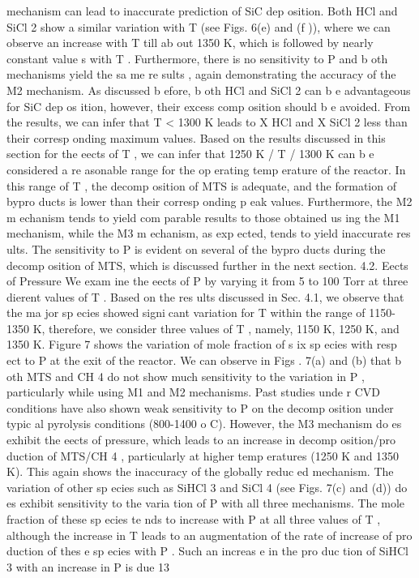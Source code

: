 \documentclass[10pt, letterpaper]{article}
\begin{document}
mechanism can lead to inaccurate prediction of SiC dep osition.
Both HCl and SiCl
2
show a similar variation with
T
(see Figs. 6(e) and (f )), where we can observe an
increase with
T
till ab out 1350 K, which is followed by nearly constant value s with
T
. Furthermore, there
is no sensitivity to
P
and b oth mechanisms yield the sa me re sults , again demonstrating the accuracy of the
M2 mechanism. As discussed b efore, b oth HCl and SiCl
2
can b e advantageous for SiC dep os ition, however,
their excess comp osition should b e avoided. From the results, we can infer that
T <
1300 K leads to
X
HCl
and
X
SiCl
2
less than their corresp onding maximum values.
Based on the results discussed in this section for the eects of
T
, we can infer that 1250 K
/
T
/
1300 K
can b e considered a re asonable range for the op erating temp erature of the reactor. In this range of
T
, the
decomp osition of MTS is adequate, and the formation of bypro ducts is lower than their corresp onding p eak
values. Furthermore, the M2 m echanism tends to yield com parable results to those obtained us ing the M1
mechanism, while the M3 m echanism, as exp ected, tends to yield inaccurate res ults. The sensitivity to
P
is evident on several of the bypro ducts during the decomp osition of MTS, which is discussed further in the
next section.
4.2. Eects of Pressure
We exam ine the eects of
P
by varying it from 5 to 100 Torr at three dierent values of
T
. Based on
the res ults discussed in Sec. 4.1, we observe that the ma jor sp ecies showed signicant variation for
T
within
the range of 1150-1350 K, therefore, we consider three values of
T
, namely, 1150 K, 1250 K, and 1350 K.
Figure 7 shows the variation of mole fraction of s ix sp ecies with resp ect to
P
at the exit of the reactor.
We can observe in Figs . 7(a) and (b) that b oth MTS and CH
4
do not show much sensitivity to the variation
in
P
, particularly while using M1 and M2 mechanisms. Past studies unde r CVD conditions have also shown
weak sensitivity to
P
on the decomp osition under typic al pyrolysis conditions (800-1400
o
C). However, the
M3 mechanism do es exhibit the eects of pressure, which leads to an increase in decomp osition/pro duction
of MTS/CH
4
, particularly at higher temp eratures (1250 K and 1350 K). This again shows the inaccuracy of
the globally reduc ed mechanism.
The variation of other sp ecies such as SiHCl
3
and SiCl
4
(see Figs. 7(c) and (d)) do es exhibit sensitivity
to the varia tion of
P
with all three mechanisms. The mole fraction of these sp ecies te nds to increase with
P
at all three values of
T
, although the increase in
T
leads to an augmentation of the rate of increase of
pro duction of thes e sp ecies with
P
. Such an increas e in the pro duc tion of SiHCl
3
with an increase in
P
is due
13
\end{document}
